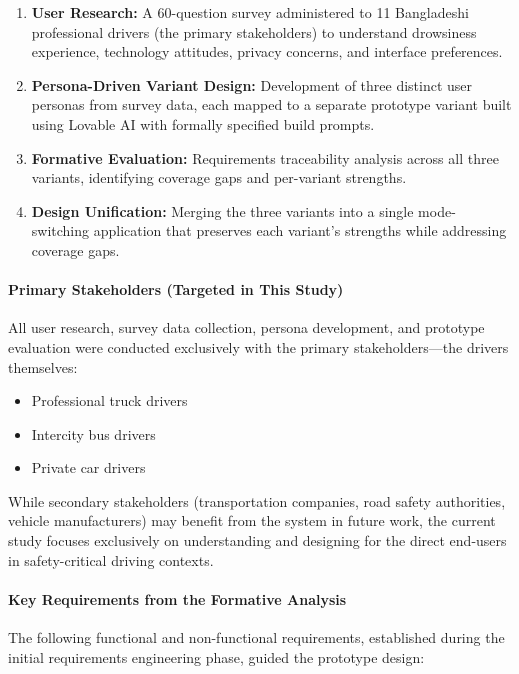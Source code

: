 \documentclass[sigconf]{acmart}
\begin{document}
\begin{enumerate}
    \item \textbf{User Research:} A 60-question survey administered to 11 Bangladeshi professional drivers (the primary stakeholders) to understand drowsiness experience, technology attitudes, privacy concerns, and interface preferences.
    \item \textbf{Persona-Driven Variant Design:} Development of three distinct user personas from survey data, each mapped to a separate prototype variant built using Lovable AI with formally specified build prompts.
    \item \textbf{Formative Evaluation:} Requirements traceability analysis across all three variants, identifying coverage gaps and per-variant strengths.
    \item \textbf{Design Unification:} Merging the three variants into a single mode-switching application that preserves each variant's strengths while addressing coverage gaps.
\end{enumerate}

\paragraph{Primary Stakeholders (Targeted in This Study)}
All user research, survey data collection, persona development, and prototype evaluation were conducted exclusively with the primary stakeholders---the drivers themselves:

\begin{itemize}
    \item Professional truck drivers
    \item Intercity bus drivers
    \item Private car drivers
\end{itemize}

While secondary stakeholders (transportation companies, road safety authorities, vehicle manufacturers) may benefit from the system in future work, the current study focuses exclusively on understanding and designing for the direct end-users in safety-critical driving contexts.

\paragraph{Key Requirements from the Formative Analysis}
The following functional and non-functional requirements, established during the initial requirements engineering phase, guided the prototype design:
\end{document}
